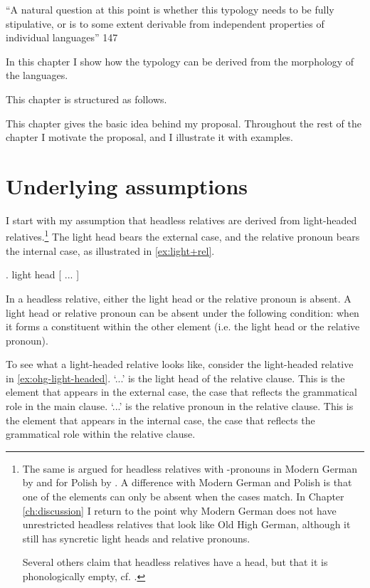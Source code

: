 ``A natural question at this point is whether this typology needs to be fully stipulative, or is to some extent derivable from independent properties of individual languages'' \citet{grosu1994}{147}

In this chapter I show how the typology can be derived from the morphology of the languages.

This chapter is structured as follows.


This chapter gives the basic idea behind my proposal. Throughout the rest of the chapter I motivate the proposal, and I illustrate it with examples.

\section{Underlying assumptions}

I start with my assumption that headless relatives are derived from light-headed relatives.\footnote{
The same is argued for headless relatives with -pronouns in Modern German by \citealt{fuss2014,hanink2018} and for Polish by \citealt{citko2004}.
A difference with Modern German and Polish is that one of the elements can only be absent when the cases match. In Chapter \ref{ch:discussion} I return to the point why Modern German does not have unrestricted headless relatives that look like Old High German, although it still has syncretic light heads and relative pronouns.

Several others claim that headless relatives have a head, but that it is phonologically empty, cf. \citealt{bresnan1978,groos1981,himmelreich2017}.
}
The light head bears the external case, and the relative pronoun bears the internal case, as illustrated in \ref{ex:light+rel}.

\ex. light head [ ... ]\label{ex:light+rel}

In a headless relative, either the light head or the relative pronoun is absent.
A light head or relative pronoun can be absent under the following condition: when it forms a constituent within the other element (i.e. the light head or the relative pronoun).

To see what a light-headed relative looks like, consider the light-headed relative in \ref{ex:ohg-light-headed}.
 `...' is the light head of the relative clause. This is the element that appears in the external case, the case that reflects the grammatical role in the main clause.
 `...' is the relative pronoun in the relative clause. This is the element that appears in the internal case, the case that reflects the grammatical role within the relative clause.

